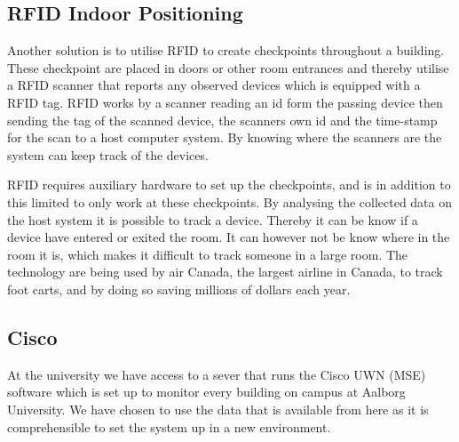 \subsection{RFID Indoor Positioning}
Another solution is to utilise RFID to create checkpoints throughout a building. These checkpoint are placed in doors or other room entrances and thereby utilise a RFID scanner that reports any observed devices which is equipped with a RFID tag\cite{indoor_bin}. 
RFID works by a scanner reading an id form the passing device then sending the tag of the scanned device, the scanners own id and the time-stamp for the scan to a host computer system. By knowing where the scanners are the system can keep track of the devices\cite{RFIDjournal}.

RFID requires auxiliary hardware to set up the checkpoints, and is in addition to this limited to only work at these checkpoints. By analysing the collected data on the host system it is possible to track a device. Thereby it can be know if a device have entered or exited the room. It can however not be know where in the room it is, which makes it difficult to track someone in a large room.
The technology are being used by air Canada, the largest airline in Canada, to track foot carts, and by doing so saving millions of dollars each year\cite{RFIDjournal}.




\subsection{Cisco}\label{subsec:cisco}
At the university we have access to a sever that runs the Cisco UWN (MSE) software which is set up to monitor every building on campus at Aalborg University. We have chosen to use the data that is available from here as it is comprehensible to set the system up in a new environment.


